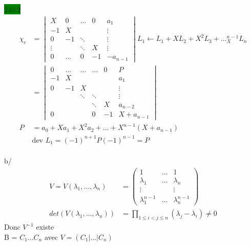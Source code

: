 \documentclass{article}
\begin{document}
\noindent \colorbox{green}{240.2}\\
\begin{align*}
    \chi_c &= \begin{vmatrix}
        X & 0 & \dots & 0 & a_1\\
        -1 & X &  &   & \vdots\\
        0 & -1 & \ddots &  & \vdots\\
        \vdots & & \ddots & X & \vdots \\
        0 & \dots & 0 & -1 & -a_{n-1}
    \end{vmatrix} L_1 \leftarrow L_1 + XL_2 + X^2 L_3 + ... _ X^{n-1}L_n\\
    &= \begin{vmatrix}
        0 & ... & ...&... & 0 & P \\
        -1 & X & & & & a_1\\
        0 & -1 & X & & & \vdots\\
        & & \ddots & \ddots & & \vdots\\
        & & &\ddots  &  X & a_{n-2}\\
        0& & & 0& -1 & X + a_{n-1}
    \end{vmatrix}\\
    P &= a_0 + Xa_1 + X^2 a_2 + ... + X^{n-1}(X+a_{n-1})\\
    &\text{dev } L_1 = (-1)^{n+1}P(-1)^{n-1} = P
\end{align*}\\
b/ \begin{align*}
    V = V(\lambda_1,...,\lambda_n) &= \begin{pmatrix}
        1 & ... & 1\\
        \lambda_1 & ... & \lambda_n\\
        \vdots & & \vdots \\
        \lambda_1^{n-1}&...&\lambda_n^{n-1}
    \end{pmatrix}\\
    det(V(\lambda_1,...,\lambda_n)) &= \prod_{1 \leq i < j \leq n}^{}(\lambda_j - \lambda_i) \neq 0
\end{align*}
Donc \(V^{-1}\) existe\\
B = \(C_1...C_n\) avec \(V=(C_1|...|C_n)\)\\
\end{document}
